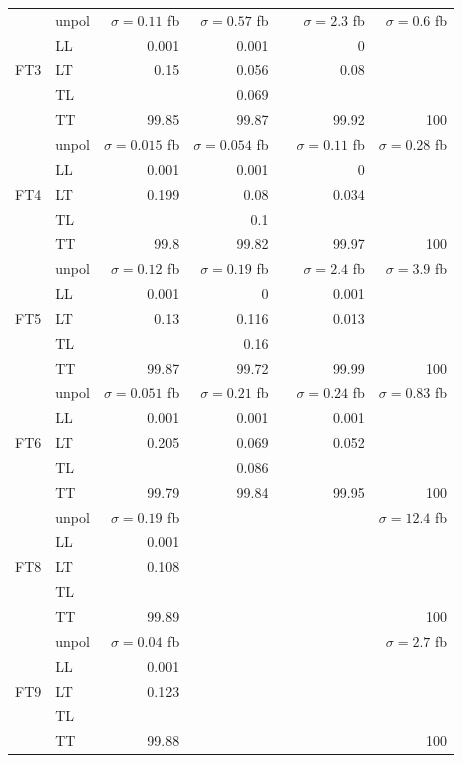 \begin{table}[h]
{\begin{tabular}{llrrrrr}
\midrule
\multirow{5}{*}{FT3}
 & unpol & $\sigma = \num{0.11}$ fb & $\sigma = \num{0.57}$ fb &  & $\sigma = \num{2.3}$ fb & $\sigma = \num{0.6}$ fb \\
 & LL & \num{0.001} & \num{0.001} &  & \num{0} &  \\
 & LT & \num{0.15} & \num{0.056} &  & \num{0.08} &  \\
 & TL &  & \num{0.069} &  &  &  \\
 & TT & \num{99.85} & \num{99.87} &  & \num{99.92} & \num{100} \\
\midrule
\multirow{5}{*}{FT4}
 & unpol & $\sigma = \num{0.015}$ fb & $\sigma = \num{0.054}$ fb &  & $\sigma = \num{0.11}$ fb & $\sigma = \num{0.28}$ fb \\
 & LL & \num{0.001} & \num{0.001} &  & \num{0} &  \\
 & LT & \num{0.199} & \num{0.08} &  & \num{0.034} &  \\
 & TL &  & \num{0.1} &  &  &  \\
 & TT & \num{99.8} & \num{99.82} &  & \num{99.97} & \num{100} \\
\midrule
\multirow{5}{*}{FT5}
 & unpol & $\sigma = \num{0.12}$ fb & $\sigma = \num{0.19}$ fb &  & $\sigma = \num{2.4}$ fb & $\sigma = \num{3.9}$ fb \\
 & LL & \num{0.001} & \num{0} &  & \num{0.001} &  \\
 & LT & \num{0.13} & \num{0.116} &  & \num{0.013} &  \\
 & TL &  & \num{0.16} &  &  &  \\
 & TT & \num{99.87} & \num{99.72} &  & \num{99.99} & \num{100} \\
\midrule
\multirow{5}{*}{FT6}
 & unpol & $\sigma = \num{0.051}$ fb & $\sigma = \num{0.21}$ fb &  & $\sigma = \num{0.24}$ fb & $\sigma = \num{0.83}$ fb \\
 & LL & \num{0.001} & \num{0.001} &  & \num{0.001} &  \\
 & LT & \num{0.205} & \num{0.069} &  & \num{0.052} &  \\
 & TL &  & \num{0.086} &  &  &  \\
 & TT & \num{99.79} & \num{99.84} &  & \num{99.95} & \num{100} \\
\midrule
\multirow{5}{*}{FT8}
 & unpol & $\sigma = \num{0.19}$ fb &  &  &  & $\sigma = \num{12.4}$ fb \\
 & LL & \num{0.001} &  &  &  &  \\
 & LT & \num{0.108} &  &  &  &  \\
 & TL &  &  &  &  &  \\
 & TT & \num{99.89} &  &  &  & \num{100} \\
\midrule
\multirow{5}{*}{FT9}
 & unpol & $\sigma = \num{0.04}$ fb &  &  &  & $\sigma = \num{2.7}$ fb \\
 & LL & \num{0.001} &  &  &  &  \\
 & LT & \num{0.123} &  &  &  &  \\
 & TL &  &  &  &  &  \\
 & TT & \num{99.88} &  &  &  & \num{100} \\
\bottomrule
\end{tabular}
}%
\end{table}